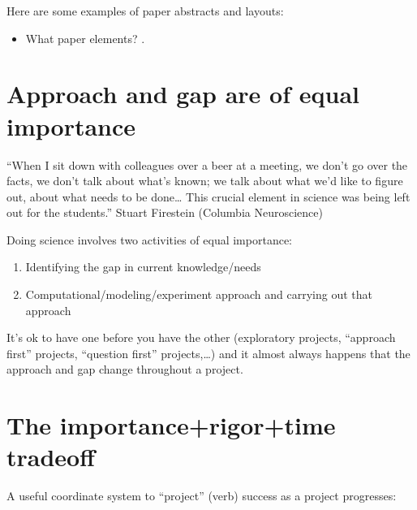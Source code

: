 \documentclass[letterpaper,10pt,english]{sphinxmanual}
\let\sphinxpxdimen\pdfpxdimen\else\newdimen\sphinxpxdimen
\begin{document}
\sphinxAtStartPar
Here are some examples of paper abstracts and layouts:
\begin{itemize}
\item {} 
\sphinxAtStartPar
What paper elements? .

\end{itemize}


\section{Approach and gap are of equal importance}
\label{\detokenize{02Elements:approach-and-gap-are-of-equal-importance}}
\sphinxAtStartPar
“When I sit down with colleagues over a beer at a meeting, we don’t go over the facts, we don’t talk about what’s known; we talk about what we’d like to figure out, about what needs to be done… This crucial element in science was being left out for the students.” \sphinxhyphen{} Stuart Firestein (Columbia Neuroscience)

\sphinxAtStartPar
Doing science involves two activities of equal importance:
\begin{enumerate}
%
\item {} 
\sphinxAtStartPar
Identifying the gap in current knowledge/needs

\item {} 
\sphinxAtStartPar
Computational/modeling/experiment approach and carrying out that approach

\end{enumerate}

\noindent\sphinxincludegraphics[width=400\sphinxpxdimen]{{figGapApproach}.pdf}

\sphinxAtStartPar
It’s ok to have one before you have the other (exploratory projects, “approach first” projects, “question first” projects,…) and it almost always happens that the approach and gap change throughout a project.


\section{The importance+rigor+time trade\sphinxhyphen{}off}
\label{\detokenize{02Elements:the-importance-rigor-time-trade-off}}
\sphinxAtStartPar
A useful coordinate system to “project” (verb) success as a project progresses:
\end{document}
